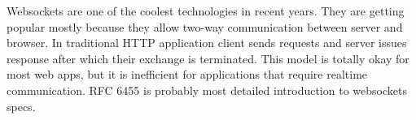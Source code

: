 Websockets are one of the coolest technologies in recent years. They are getting popular mostly because they allow two-way communication between server and browser. In traditional HTTP application client sends requests and server issues response after which their exchange is terminated. This model is totally okay for most web apps, but it is inefficient for applications that require realtime communication. RFC 6455 is probably most detailed introduction to websockets specs.
